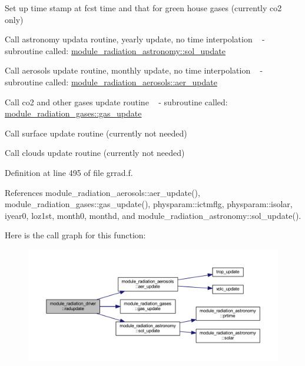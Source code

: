 \begin{DoxyEnumerate}
\item Set up time stamp at fcst time and that for green house gases (currently co2 only)
\item Call astronomy updata routine, yearly update, no time interpolation ~\newline
 -\/ subroutine called\+: \hyperlink{namespacemodule__radiation__astronomy_a7c3585f7355925b360f5bc5d2c25c09e}{module\+\_\+radiation\+\_\+astronomy\+::sol\+\_\+update}
\item Call aerosols update routine, monthly update, no time interpolation ~\newline
 -\/ subroutine called\+: \hyperlink{namespacemodule__radiation__aerosols_a2a91dba33725576c80b4b0f556031707}{module\+\_\+radiation\+\_\+aerosols\+::aer\+\_\+update}
\item Call co2 and other gases update routine ~\newline
 -\/ subroutine called\+: \hyperlink{namespacemodule__radiation__gases_a064db1c287e8614ae7efd6b4fac91a6b}{module\+\_\+radiation\+\_\+gases\+::gas\+\_\+update}
\item Call surface update routine (currently not needed)
\item Call clouds update routine (currently not needed) 
\end{DoxyEnumerate}

Definition at line 495 of file grrad.\+f.



References module\+\_\+radiation\+\_\+aerosols\+::aer\+\_\+update(), module\+\_\+radiation\+\_\+gases\+::gas\+\_\+update(), physparam\+::ictmflg, physparam\+::isolar, iyear0, loz1st, month0, monthd, and module\+\_\+radiation\+\_\+astronomy\+::sol\+\_\+update().



Here is the call graph for this function\+:
\nopagebreak
\begin{figure}[H]
\begin{center}
\leavevmode
\includegraphics[width=350pt]{namespacemodule__radiation__driver_a47f0e4defe607fbfc751f6c9274f459a_cgraph}
\end{center}
\end{figure}




